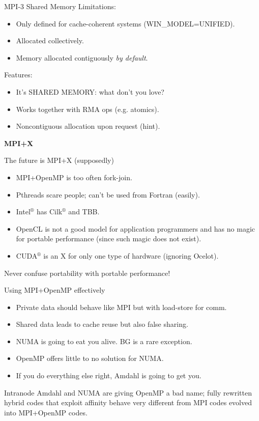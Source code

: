 \documentclass[11pt]{beamer}
\begin{document}
\begin{frame}{MPI-3 Shared Memory}\Large
    Limitations: \\
    \begin{itemize}
        \item Only defined for cache-coherent systems (WIN\_MODEL=UNIFIED).
        \item Allocated collectively.
        \item Memory allocated contiguously \textit{by default}.
    \end{itemize}
    Features: \\
    \begin{itemize}
        \item It's SHARED MEMORY: what don't you love?
        \item Works together with RMA ops (e.g. atomics).
        \item Noncontiguous allocation upon request (hint).
    \end{itemize}
\end{frame}

\begin{frame}{} \LARGE
  \begin{center}
      \textbf{MPI+X}
  \end{center}
\end{frame}

\begin{frame}[fragile]{The future is MPI+X (supposedly)} \large
\begin{itemize}
	\item MPI+OpenMP is too often fork-join.
	\item Pthreads scare people; can't be used from Fortran (easily).
	\item Intel$^\circledR$ has Cilk$^\circledR$ and TBB.
	\item OpenCL is not a good model for application programmers
          and has no magic for portable performance (since such magic does not exist).
	\item CUDA$^\circledR$ is an X for only one type of hardware (ignoring Ocelot).
\end{itemize}
Never confuse portability with portable performance!
\end{frame}

\begin{frame}{Using MPI+OpenMP effectively} \Large 
\begin{itemize}
	\item Private data should behave like MPI but with load-store for comm.
	\item Shared data leads to cache reuse but also false sharing.
	\item NUMA is going to eat you alive.  BG is a rare exception.
	\item OpenMP offers little to no solution for NUMA.
	\item If you do everything else right, Amdahl is going to get you.
\end{itemize}
Intranode Amdahl and NUMA are giving OpenMP a bad name;
fully rewritten hybrid codes that exploit affinity behave very different
from MPI codes evolved into MPI+OpenMP codes.
\end{frame}
\end{document}
